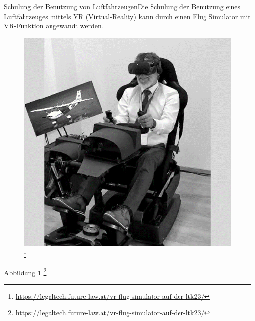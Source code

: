 Schulung der Benutzung von LuftfahrzeugenDie Schulung der Benutzung eines Luftfahrzeuges mittels VR (Virtual-Reality) kann durch einen Flug Simulator mit VR-Funktion angewandt werden.
\begin{figure}[!ht]
    \centering
    \includegraphics[width=1.0\textwidth]{images/Abbildung 1.png}
    \caption{\label{fig:Abbildung 1}\footnote{\url{https://legaltech.future-law.at/vr-flug-simulator-auf-der-ltk23/}}\protect
    }
\end{figure}
Abbildung 1 \footnote{\url{https://legaltech.future-law.at/vr-flug-simulator-auf-der-ltk23/}}
